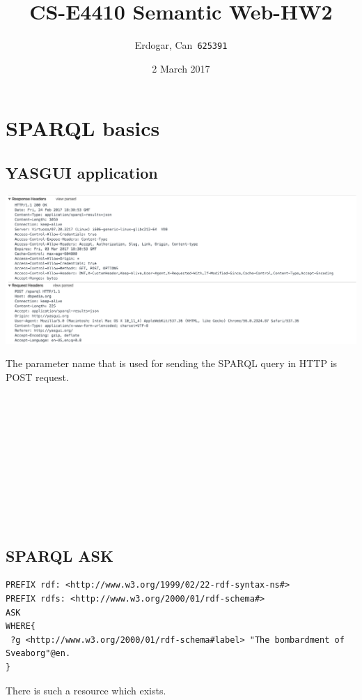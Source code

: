 \documentclass{article}
\title{CS-E4410 Semantic Web-HW2}
\author{
  Erdogar, Can\      \texttt{625391}
}
\date{ 2 March 2017}
\begin{document}
\maketitle

\section{SPARQL basics}

\subsection{YASGUI application}

\includegraphics[width=\textwidth]{rdf-grapher.png}

The parameter name that is used for sending the SPARQL query in HTTP is POST request.

$ $

$ $

$ $

$ $

$ $

$ $


\subsection{SPARQL ASK}

\begin{verbatim}
PREFIX rdf: <http://www.w3.org/1999/02/22-rdf-syntax-ns#>
PREFIX rdfs: <http://www.w3.org/2000/01/rdf-schema#>
ASK
WHERE{
 ?g <http://www.w3.org/2000/01/rdf-schema#label> "The bombardment of Sveaborg"@en.
}
\end{verbatim}

There is such a resource which exists.

$ $

$ $

$ $

$ $

$ $
\end{document}
